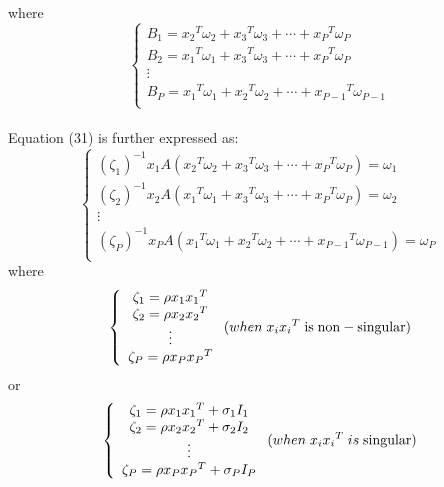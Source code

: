 \documentclass[journal]{IEEEtran}
\begin{document}
where
\begin{equation}
\left\{ {\begin{array}{*{20}{c}}
   {{B_1} = {x_2}^T{\omega _2} + {x_3}^T{\omega _3} +  \cdots  + {x_P}^T{\omega _P}}  \\
   {{B_2} = {x_1}^T{\omega _1} + {x_3}^T{\omega _3} +  \cdots  + {x_P}^T{\omega _P}}  \\
    \vdots   \\
   {{B_P} = {x_1}^T{\omega _1} + {x_2}^T{\omega _2} +  \cdots  + {x_{P - 1}}^T{\omega _{P - 1}}}  \\
\end{array}} \right.
\end{equation}\\\indent
Equation (31) is further expressed as:
\begin{equation}
\left\{ {\begin{array}{*{20}{c}}
   {{{({\zeta _1})}^{ - 1}}{x_1}A({x_2}^T{\omega _2} + {x_3}^T{\omega _3} +  \cdots  + {x_P}^T{\omega _P}) = {\omega _1}}  \\
   {{{({\zeta _2})}^{ - 1}}{x_2}A({x_1}^T{\omega _1} + {x_3}^T{\omega _3} +  \cdots  + {x_P}^T{\omega _P}) = {\omega _2}}  \\
    \vdots   \\
   {{{({\zeta _P})}^{ - 1}}{x_P}A({x_1}^T{\omega _1} + {x_2}^T{\omega _2} +  \cdots  + {x_{P - 1}}^T{\omega _{P - 1}}) = {\omega _P}}  \\
\end{array}} \right.
\end{equation}
where
\begin{equation}
\left\{ {\begin{array}{*{20}{c}}
   {{\zeta _1} = {\rho}{x_1}{x_1}^T}  \\
   {{\zeta _2} = {\rho}{x_2}{x_2}^T}  \\
    \vdots   \\
   {{\zeta _P} = {\rho}{x_P}{x_P}^T}  \\
\end{array}} \right.(when\;{\rm{ }}{x_i}{x_i}^T{\rm{ \;is\; non-singular}})
\end{equation}
or\\
\begin{equation}
\left\{ {\begin{array}{*{20}{c}}
   {{\zeta _1} = {\rho}{x_1}{x_1}^T + {\sigma _1}{I_1}}  \\
   {{\zeta _2} = {\rho}{x_2}{x_2}^T + {\sigma _2}{I_2}}  \\
    \vdots   \\
   {{\rm{  }}{\zeta _P} = {\rho}{x_P}{x_P}^T + {\sigma _P}{I_P}}  \\
\end{array}} \right.(when\;{x_i}{x_i}^T\;is\;{\rm{singular}})
\end{equation}
\end{document}
